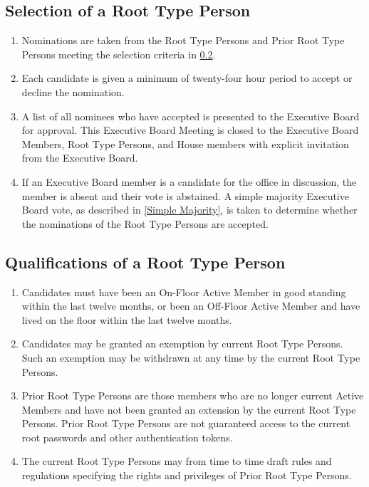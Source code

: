 \documentclass{article}
\newcommand{\bsection}[1]{\subsection{#1} \label{#1}}
\begin{document}
\bsection{Selection of a Root Type Person}
\renewcommand{\theenumi}{\alph{enumi}} %
\begin{enumerate}
	\item Nominations are taken from the Root Type Persons and Prior Root Type Persons meeting the selection criteria in \ref{Qualifications of a Root Type Person}.
	\item Each candidate is given a minimum of twenty-four hour period to accept or decline the nomination.
	\item A list of all nominees who have accepted is presented to the Executive Board for approval. This Executive Board Meeting is closed to the Executive Board Members, Root Type Persons, and House members with explicit invitation from the Executive Board.
	\item If an Executive Board member is a candidate for the office in discussion, the member is absent and their vote is abstained.
		A simple majority Executive Board vote, as described in \ref{Simple Majority}, is taken to determine whether the nominations of the Root Type Persons are accepted.
\end{enumerate}

\bsection{Qualifications of a Root Type Person}
\renewcommand{\theenumi}{\alph{enumi}} %
\begin{enumerate}
	\item Candidates must have been an On-Floor Active Member in good standing within the last twelve months, or been an Off-Floor Active Member and have lived on the floor within the last twelve months.
	\item Candidates may be granted an exemption by current Root Type Persons. Such an exemption may be withdrawn at any time by the current Root Type Persons.
	\item Prior Root Type Persons are those members who are no longer current Active Members and have not been granted an extension by the current Root Type Persons.
		Prior Root Type Persons are not guaranteed access to the current root passwords and other authentication tokens.
	\item The current Root Type Persons may from time to time draft rules and regulations specifying the rights and privileges of Prior Root Type Persons.
\end{enumerate}
\end{document}
